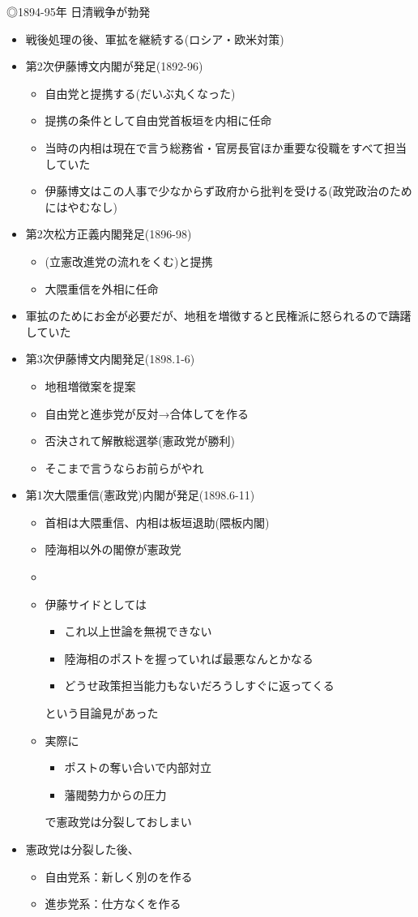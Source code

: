 \documentclass[12pt,fleqn]{ltjsarticle}
\begin{document}
◎1894-95年 日清戦争が勃発
\begin{itemize}
\item 戦後処理の後、軍拡を継続する(ロシア・欧米対策)
\item 第2次伊藤博文内閣が発足(1892-96)
\begin{itemize}
\item 自由党と提携する(だいぶ丸くなった)
\item 提携の条件として自由党首板垣を内相に任命
\item 当時の内相は現在で言う総務省・官房長官ほか重要な役職をすべて担当していた
\item 伊藤博文はこの人事で少なからず政府から批判を受ける(政党政治のためにはやむなし)
\end{itemize}
\item 第2次松方正義内閣発足(1896-98)
\begin{itemize}
\item {}(立憲改進党の流れをくむ)と提携
\item 大隈重信を外相に任命
\end{itemize}
\item 軍拡のためにお金が必要だが、地租を増徴すると民権派に怒られるので躊躇していた
\item 第3次伊藤博文内閣発足(1898.1-6)
\begin{itemize}
\item 地租増徴案を提案
\item 自由党と進歩党が反対→合体してを作る
\item 否決されて解散総選挙(憲政党が勝利)
\item そこまで言うならお前らがやれ
\end{itemize}
\item 第1次大隈重信(憲政党)内閣が発足(1898.6-11)
\begin{itemize}
\item 首相は大隈重信、内相は板垣退助(隈板内閣)
\item 陸海相以外の閣僚が憲政党
\item {}
\item 伊藤サイドとしては
\begin{itemize}
\item これ以上世論を無視できない
\item 陸海相のポストを握っていれば最悪なんとかなる
\item どうせ政策担当能力もないだろうしすぐに返ってくる
\end{itemize}
という目論見があった
\item 実際に
\begin{itemize}
\item ポストの奪い合いで内部対立
\item 藩閥勢力からの圧力
\end{itemize}
で憲政党は分裂しておしまい
\end{itemize}
\item 憲政党は分裂した後、
\begin{itemize}
\item 自由党系：新しく別のを作る
\item 進歩党系：仕方なくを作る
\end{itemize}
\end{itemize}
\end{document}
